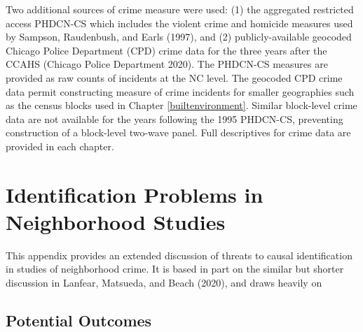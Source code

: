 \documentclass [11pt, proquest] {uwthesis}[2015/03/03]
\begin{document}
Two additional sources of crime measure were used: (1) the aggregated restricted access PHDCN-CS which includes the violent crime and homicide measures used by Sampson, Raudenbush, and Earls (1997), and (2) publicly-available geocoded Chicago Police Department (CPD) crime data for the three years after the CCAHS ({Chicago Police Department} 2020). The PHDCN-CS measures are provided as raw counts of incidents at the NC level. The geocoded CPD crime data permit constructing measure of crime incidents for smaller geographies such as the census blocks used in Chapter \ref{builtenvironment}. Similar block-level crime data are not available for the years following the 1995 PHDCN-CS, preventing construction of a block-level two-wave panel. Full descriptives for crime data are provided in each chapter.

\hypertarget{identification}{%
\chapter{Identification Problems in Neighborhood Studies}\label{identification}}

This appendix provides an extended discussion of threats to causal identification in studies of neighborhood crime. It is based in part on the similar but shorter discussion in Lanfear, Matsueda, and Beach (2020), and draws heavily on

\hypertarget{potential-outcomes}{%
\section{Potential Outcomes}\label{potential-outcomes}}
\end{document}
